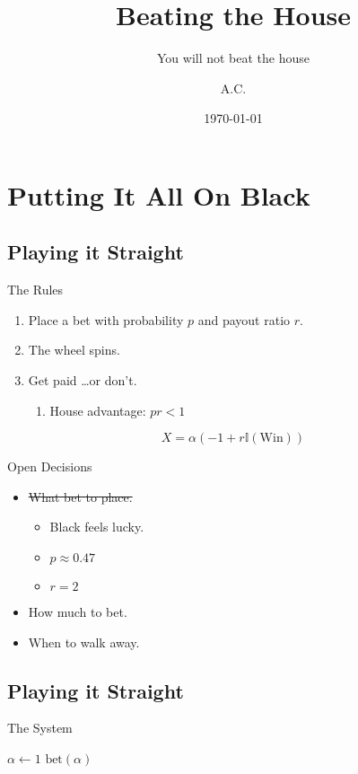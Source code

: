 \documentclass[pdf]{beamer}
\title{Beating the House}
\subtitle{You will not beat the house}
\author{A.C.}
\date{\today}
\begin{document}
\begin{frame}
  \titlepage
\end{frame}

\section{Putting It All On Black}

\subsection{Playing it Straight}

\begin{frame}{The Rules}
  \begin{enumerate}
  \item Place a bet with probability $p$ and payout ratio $r$.
  \item The wheel spins.
  \item Get paid \ldots or don't.
    \begin{enumerate}
      \item House advantage: $pr < 1$
    \end{enumerate}
  \end{enumerate}

  \[ X = \alpha \left(-1 + r\mathbb{I}(\text{Win})\right) \]
\end{frame}

\begin{frame}{Open Decisions}
  \begin{itemize}
  \item \sout{What bet to place.}
    \begin{itemize}
    \item Black feels lucky.
    \item $p \approx 0.47$
    \item $r = 2$
    \end{itemize}
  \item How much to bet.
  \item When to walk away.
  \end{itemize}
\end{frame}

\subsection{Playing it Straight}
\begin{frame}{The System}
  \begin{algorithmic}
    \State $\alpha \gets 1$
      \State $\text{bet}(\alpha)$
    \EndWhile
    \EndProcedure
  \end{algorithmic}
\end{frame}
\end{document}
